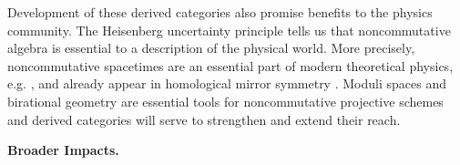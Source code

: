 \documentclass[11pt]{article}
\begin{document}
Development of these derived categories also promise benefits to the physics community.
The Heisenberg uncertainty principle tells us that noncommutative algebra is essential to a description of the physical world.
More precisely, noncommutative spacetimes are an essential part of modern theoretical physics, e.g. \cite{DoNe01}, and already appear in homological mirror symmetry \cite{AKO08}.
Moduli spaces and birational geometry are essential tools for noncommutative projective schemes and derived categories will serve to strengthen and extend their reach.

\noindent\textbf{Broader Impacts.}


\end{document}

